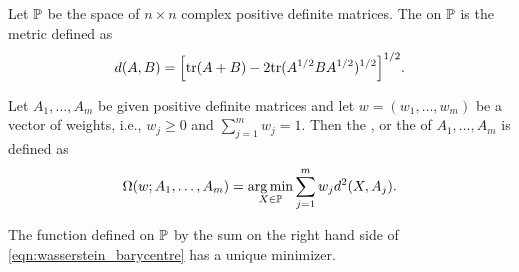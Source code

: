\documentclass[11pt,a4paper]{article}
\begin{document}
\begin{definition}
    Let $\mathbb{P}$ be the space of $n\times n$ complex positive definite matrices. The   on $\mathbb{P}$ is the metric defined as 
    \begin{equation}\label{eqn:bw_dist}
        d(A,B) = \Big[\mathrm{tr}(A+B) - 2\mathrm{tr}(A^{1/2}BA^{1/2})^{1/2} \Big]^{1/2}.
    \end{equation}
\end{definition}

\begin{definition}
    Let $A_1,\ldots, A_m$ be given positive definite matrices and let $w = (w_1,\ldots, w_m)$ be a vector of weights, i.e., $w_j\ge 0$ and $\sum_{j=1}^m w_j = 1$. Then the , or the  of $A_1,\ldots,A_m$ is defined as 
    \begin{equation}\label{eqn:wasserstein_barycentre}
        \Omega(w; A_1,\ldots,A_m) = \underset{X\in\mathbb{P}}{\arg\min}\sum_{j=1}^m w_j d^2(X,A_j).
    \end{equation}
\end{definition}

\begin{remark}
    The function defined on $\mathbb{P}$ by the sum on the right hand side of \eqref{eqn:wasserstein_barycentre} has a unique minimizer. 
\end{remark}
\end{document}
